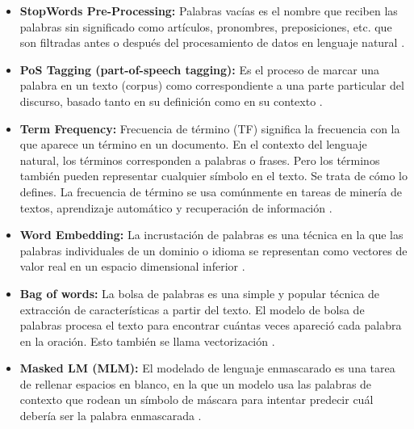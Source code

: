 \documentclass[../Main.tex]{subfiles}
\begin{document}
\begin{itemize}
    \item \textbf{StopWords Pre-Processing:} Palabras vacías es el nombre que reciben las palabras sin significado como artículos, pronombres, preposiciones, etc. que son filtradas antes o después del procesamiento de datos en lenguaje natural \cite{35}. \par
    
    \item \textbf{PoS Tagging (part-of-speech tagging):} Es el proceso de marcar una palabra en un texto (corpus) como correspondiente a una parte particular del discurso, basado tanto en su definición como en su contexto \cite{36}. \par

    \item \textbf{Term Frequency:} Frecuencia de término (TF) significa la frecuencia con la que aparece un término en un documento. En el contexto del lenguaje natural, los términos corresponden a palabras o frases. Pero los términos también pueden representar cualquier símbolo en el texto. Se trata de cómo lo defines. La frecuencia de término se usa comúnmente en tareas de minería de textos, aprendizaje automático y recuperación de información \cite{37}. \par
    
    \item \textbf{Word Embedding:} La incrustación de palabras es una técnica en la que las palabras individuales de un dominio o idioma se representan como vectores de valor real en un espacio dimensional inferior \cite{38}. \par
    
    \item \textbf{Bag of words:} La bolsa de palabras es una simple y popular técnica de extracción de características a partir del texto. El modelo de bolsa de palabras procesa el texto para encontrar cuántas veces apareció cada palabra en la oración. Esto también se llama vectorización \cite{38}. \par
    
    \item \textbf{Masked LM (MLM):} El modelado de lenguaje enmascarado es una tarea de rellenar espacios en blanco, en la que un modelo usa las palabras de contexto que rodean un símbolo de máscara para intentar predecir cuál debería ser la palabra enmascarada \cite{39}. \par
    

\end{itemize}
\end{document}
